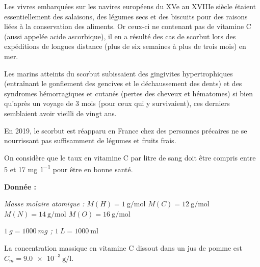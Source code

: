 \vspace{24pt}

\medskip
Les vivres embarquées sur les navires européens du XVe au XVIIIe siècle étaient essentiellement des salaisons, des légumes secs et des biscuits pour des raisons liées à la conservation des aliments. Or ceux-ci ne contenant pas de vitamine C (aussi appelée acide ascorbique), il en a résulté des cas de scorbut lors des expéditions de longues distance (plus de six semaines à plus de trois mois) en mer.

\medskip
Les marins atteints du scorbut subissaient des gingivites hypertrophiques (entraînant le gonflement des gencives et le déchaussement des dents) et des syndromes hémorragiques et cutanés (pertes des cheveux et hématomes) si bien qu'après un voyage de 3 mois (pour ceux qui y survivaient), ces derniers semblaient avoir vieilli de vingt ans. 

\medskip
En 2019, le scorbut est réapparu en France chez des personnes précaires ne se nourrissant pas suffisamment de légumes et fruits frais.

\medskip
On considère que le taux en vitamine C par litre de sang doit être compris entre \num{5}  et \num{17}  \unit{\mg\per\litre} pour être en bonne santé.

\medskip
\textbf{Donnée : } 

\textit{Masse molaire atomique : $M(H) = \qty{1} {\g\per\mole}$ $M(C) = \qty{12} {\g\per\mole}$ $M(N) = \qty{14} {\g\per\mole}$ $M(O) = \qty{16} {\g\per\mole}$}

\textit{ $\qty{1} {g} = \qty{1 000} {mg}$   ;  $\qty{1} {L} = \qty{1 000} {\ml}$ }

\bigskip
{}

La concentration massique en vitamine C dissout dans un jus de pomme est $C_m = \qty{9,0e-3}{\g\per\litre}$.



